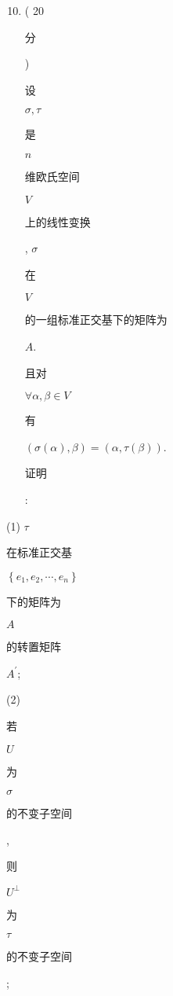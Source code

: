\documentclass[10pt]{article}
\begin{document}
\begin{enumerate}
  \setcounter{enumi}{9}
  \item ( 20 \begin{CJK}{UTF8}{mj}分\end{CJK}) \begin{CJK}{UTF8}{mj}设\end{CJK} $\sigma, \tau$ \begin{CJK}{UTF8}{mj}是\end{CJK} $n$ \begin{CJK}{UTF8}{mj}维欧氏空间\end{CJK} $V$ \begin{CJK}{UTF8}{mj}上的线性变换\end{CJK}, $\sigma$ \begin{CJK}{UTF8}{mj}在\end{CJK} $V$ \begin{CJK}{UTF8}{mj}的一组标准正交基下的矩阵为\end{CJK} $A$. \begin{CJK}{UTF8}{mj}且对\end{CJK} $\forall \alpha, \beta \in V$ \begin{CJK}{UTF8}{mj}有\end{CJK} $(\sigma(\alpha), \beta)=(\alpha, \tau(\beta))$. \begin{CJK}{UTF8}{mj}证明\end{CJK}:
\end{enumerate}
(1) $\tau$ \begin{CJK}{UTF8}{mj}在标准正交基\end{CJK} $\left\{e_{1}, e_{2}, \cdots, e_{n}\right\}$ \begin{CJK}{UTF8}{mj}下的矩阵为\end{CJK} $A$ \begin{CJK}{UTF8}{mj}的转置矩阵\end{CJK} $A^{\prime}$;

(2) \begin{CJK}{UTF8}{mj}若\end{CJK} $U$ \begin{CJK}{UTF8}{mj}为\end{CJK} $\sigma$ \begin{CJK}{UTF8}{mj}的不变子空间\end{CJK}, \begin{CJK}{UTF8}{mj}则\end{CJK} $U^{\perp}$ \begin{CJK}{UTF8}{mj}为\end{CJK} $\tau$ \begin{CJK}{UTF8}{mj}的不变子空间\end{CJK};
\end{document}
